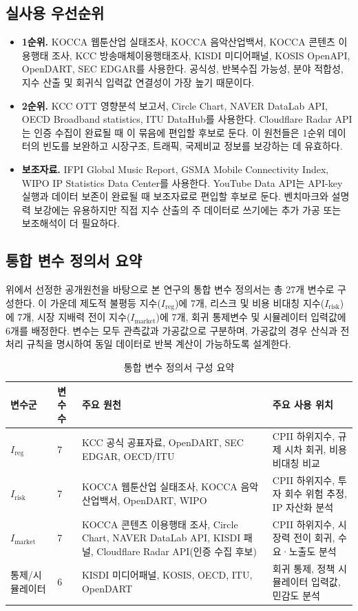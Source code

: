 \documentclass[11pt,a4paper]{report}
\begin{document}
\subsection{실사용 우선순위}
\begin{itemize}[leftmargin=*, itemsep=0.5em]
  \item \textbf{1순위.} KOCCA 웹툰산업 실태조사, KOCCA 음악산업백서, KOCCA 콘텐츠 이용행태 조사, KCC 방송매체이용행태조사, KISDI 미디어패널, KOSIS OpenAPI, OpenDART, SEC EDGAR를 사용한다. 공식성, 반복수집 가능성, 분야 적합성, 지수 산출 및 회귀식 입력값 연결성이 가장 높기 때문이다.
  \item \textbf{2순위.} KCC OTT 영향분석 보고서, Circle Chart, NAVER DataLab API, OECD Broadband statistics, ITU DataHub를 사용한다. Cloudflare Radar API는 인증 수집이 완료될 때 이 묶음에 편입할 후보로 둔다. 이 원천들은 1순위 데이터의 빈도를 보완하고 시장구조, 트래픽, 국제비교 정보를 보강하는 데 유효하다.
  \item \textbf{보조자료.} IFPI Global Music Report, GSMA Mobile Connectivity Index, WIPO IP Statistics Data Center를 사용한다. YouTube Data API는 API-key 실행과 데이터 보존이 완료될 때 보조자료로 편입할 후보로 둔다. 벤치마크와 설명력 보강에는 유용하지만 직접 지수 산출의 주 데이터로 쓰기에는 추가 가공 또는 보조해석이 더 필요하다.
\end{itemize}

\subsection{통합 변수 정의서 요약}
위에서 선정한 공개원천을 바탕으로 본 연구의 통합 변수 정의서는 총 27개 변수로 구성한다. 이 가운데 제도적 불평등 지수($I_{\mathrm{reg}}$)에 7개, 리스크 및 비용 비대칭 지수($I_{\mathrm{risk}}$)에 7개, 시장 지배력 전이 지수($I_{\mathrm{market}}$)에 7개, 회귀 통제변수 및 시뮬레이터 입력값에 6개를 배정한다. 변수는 모두 관측값과 가공값으로 구분하며, 가공값의 경우 산식과 전처리 규칙을 명시하여 동일 데이터로 반복 계산이 가능하도록 설계한다.

\begin{table}[H]
  \centering
  \small
  \caption{통합 변수 정의서 구성 요약}
  \begin{tabular}{L{2.6cm}L{1.4cm}L{5.0cm}L{5.2cm}}
    \toprule
    변수군 & 변수 수 & 주요 원천 & 주요 사용 위치 \\
    \midrule
    $I_{\mathrm{reg}}$ & 7 & KCC 공식 공표자료, OpenDART, SEC EDGAR, OECD/ITU & CPII 하위지수, 규제 시차 회귀, 비용 비대칭 비교 \\
    $I_{\mathrm{risk}}$ & 7 & KOCCA 웹툰산업 실태조사, KOCCA 음악산업백서, OpenDART, WIPO & CPII 하위지수, 투자 회수 위험 추정, IP 자산화 분석 \\
    $I_{\mathrm{market}}$ & 7 & KOCCA 콘텐츠 이용행태 조사, Circle Chart, NAVER DataLab API, KISDI 패널, Cloudflare Radar API(인증 수집 후보) & CPII 하위지수, 시장력 전이 회귀, 수요·노출도 분석 \\
    통제/시뮬레이터 & 6 & KISDI 미디어패널, KOSIS, OECD, ITU, OpenDART & 회귀 통제, 정책 시뮬레이터 입력값, 민감도 분석 \\
    \bottomrule
  \end{tabular}
\end{table}
\end{document}
